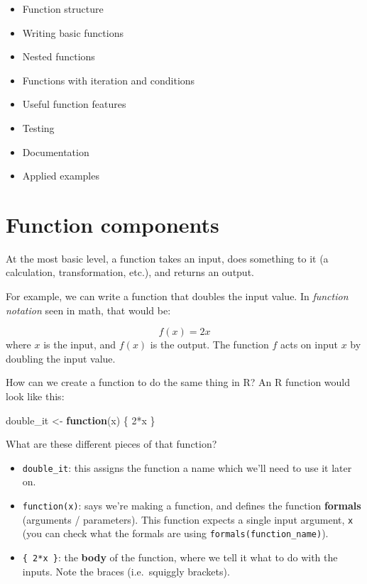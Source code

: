 \documentclass[
]{book}
\newenvironment{Shaded}{\begin{snugshade}}{\end{snugshade}}
\newcommand{\ControlFlowTok}[1]{\textcolor[rgb]{0.13,0.29,0.53}{\textbf{#1}}}
\newcommand{\DecValTok}[1]{\textcolor[rgb]{0.00,0.00,0.81}{#1}}
\newcommand{\NormalTok}[1]{#1}
\newcommand{\OtherTok}[1]{\textcolor[rgb]{0.56,0.35,0.01}{#1}}
\newcommand{\SpecialCharTok}[1]{\textcolor[rgb]{0.00,0.00,0.00}{#1}}
\providecommand{\tightlist}{%
  \setlength{\itemsep}{0pt}\setlength{\parskip}{0pt}}
\begin{document}
\begin{itemize}
\tightlist
\item
  Function structure
\item
  Writing basic functions
\item
  Nested functions
\item
  Functions with iteration and conditions
\item
  Useful function features
\item
  Testing
\item
  Documentation
\item
  Applied examples
\end{itemize}

\hypertarget{function-components}{%
\section{Function components}\label{function-components}}

At the most basic level, a function takes an input, does something to it (a calculation, transformation, etc.), and returns an output.

For example, we can write a function that doubles the input value. In \emph{function notation} seen in math, that would be:

\[f(x) = 2x\]
where \(x\) is the input, and \(f(x)\) is the output. The function \(f\) acts on input \(x\) by doubling the input value.

How can we create a function to do the same thing in R? An R function would look like this:

\begin{Shaded}
\begin{Highlighting}[]
\NormalTok{double\_it }\OtherTok{\textless{}{-}} \ControlFlowTok{function}\NormalTok{(x) \{}
  \DecValTok{2}\SpecialCharTok{*}\NormalTok{x}
\NormalTok{\}}
\end{Highlighting}
\end{Shaded}

What are these different pieces of that function?

\begin{itemize}
\tightlist
\item
  \texttt{double\_it}: this assigns the function a name which we'll need to use it later on.
\item
  \texttt{function(x)}: says we're making a function, and defines the function \textbf{formals} (arguments / parameters). This function expects a single input argument, \texttt{x} (you can check what the formals are using \texttt{formals(function\_name)}).
\item
  \texttt{\{\ 2*x\ \}}: the \textbf{body} of the function, where we tell it what to do with the inputs. Note the braces (i.e.~squiggly brackets).
\end{itemize}
\end{document}

